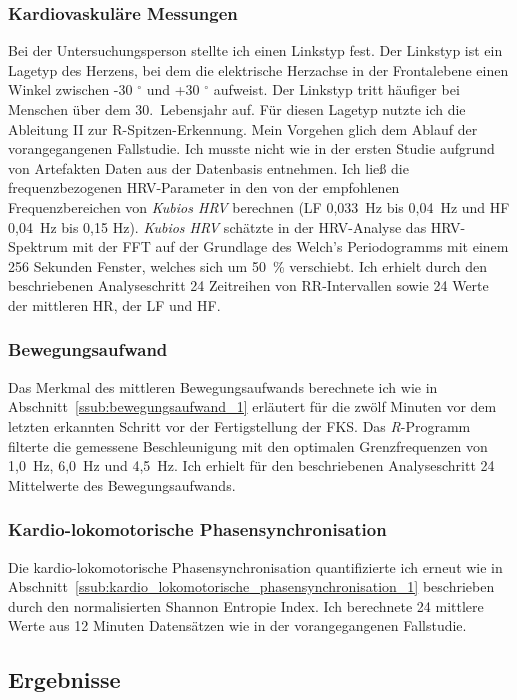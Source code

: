 \subsubsection{Kardiovaskuläre Messungen}
Bei der Untersuchungsperson stellte ich einen Linkstyp fest. Der Linkstyp ist ein Lagetyp des Herzens, bei dem die elektrische Herzachse in der Frontalebene einen Winkel zwischen -30 $^{\circ}$ und +30 $^{\circ}$ aufweist. Der Linkstyp tritt häufiger bei Menschen über dem 30.~Lebensjahr auf. Für diesen Lagetyp nutzte ich die Ableitung II zur R-Spitzen-Erkennung. Mein Vorgehen glich dem Ablauf der vorangegangenen Fallstudie. Ich musste nicht wie in der ersten Studie aufgrund von Artefakten Daten aus der Datenbasis entnehmen. Ich ließ die frequenzbezogenen \ac{HRV}-Parameter in den von der \citet[][S.~360]{TaskForce1996} empfohlenen Frequenzbereichen von \emph{Kubios HRV} berechnen (\ac{LF} 0,033~Hz bis 0,04~Hz und \ac{HF} 0,04~Hz bis 0,15 Hz). \emph{Kubios HRV} schätzte in der \ac{HRV}-Analyse das \ac{HRV}-Spektrum mit der \acs{FFT} auf der Grundlage des Welch’s Periodogramms mit einem 256 Sekunden Fenster, welches sich um 50~\% verschiebt. Ich erhielt durch den beschriebenen Analyseschritt 24 Zeitreihen von RR-Intervallen sowie 24 Werte der mittleren \ac{HR}, der \ac{LF} und \ac{HF}.

\subsubsection{Bewegungsaufwand}
Das Merkmal des mittleren Bewegungsaufwands berechnete ich wie in Abschnitt~\ref{ssub:bewegungsaufwand_1} erläutert für die zwölf Minuten vor dem letzten erkannten Schritt vor der Fertigstellung der \ac{FKS}. Das \emph{R}-Programm filterte die gemessene Beschleunigung mit den optimalen Grenzfrequenzen von 1,0~Hz, 6,0~Hz und 4,5~Hz. Ich erhielt für den beschriebenen Analyseschritt 24 Mittelwerte des Bewegungsaufwands. 

\subsubsection{Kardio-lokomotorische Phasensynchronisation}
Die kardio-lokomotorische Phasensynchronisation quantifizierte ich erneut wie in Abschnitt~\ref{ssub:kardio_lokomotorische_phasensynchronisation_1} beschrieben durch den normalisierten Shannon Entropie Index. Ich berechnete 24 mittlere Werte aus 12 Minuten Datensätzen wie in der vorangegangenen Fallstudie.

\subsection{Ergebnisse}

